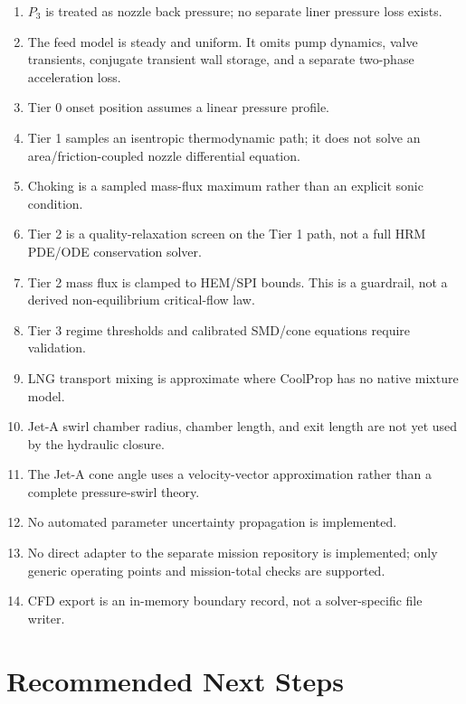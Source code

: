 \documentclass[11pt]{article}
\begin{document}
\begin{enumerate}
  \item $P_3$ is treated as nozzle back pressure; no separate liner pressure loss exists.
  \item The feed model is steady and uniform. It omits pump dynamics, valve transients,
  conjugate transient wall storage, and a separate two-phase acceleration loss.
  \item Tier 0 onset position assumes a linear pressure profile.
  \item Tier 1 samples an isentropic thermodynamic path; it does not solve an
  area/friction-coupled nozzle differential equation.
  \item Choking is a sampled mass-flux maximum rather than an explicit sonic condition.
  \item Tier 2 is a quality-relaxation screen on the Tier 1 path, not a full HRM PDE/ODE
  conservation solver.
  \item Tier 2 mass flux is clamped to HEM/SPI bounds. This is a guardrail, not a derived
  non-equilibrium critical-flow law.
  \item Tier 3 regime thresholds and calibrated SMD/cone equations require validation.
  \item LNG transport mixing is approximate where CoolProp has no native mixture model.
  \item Jet-A swirl chamber radius, chamber length, and exit length are not yet used by
  the hydraulic closure.
  \item The Jet-A cone angle uses a velocity-vector approximation rather than a complete
  pressure-swirl theory.
  \item No automated parameter uncertainty propagation is implemented.
  \item No direct adapter to the separate mission repository is implemented; only generic
  operating points and mission-total checks are supported.
  \item CFD export is an in-memory boundary record, not a solver-specific file writer.
\end{enumerate}

\section{Recommended Next Steps}
\end{document}
